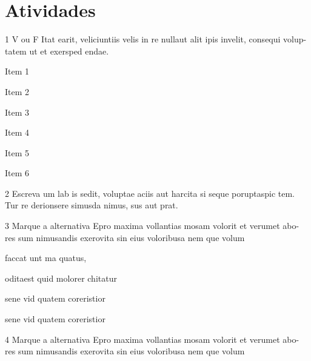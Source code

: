 \pagebreak
\section{Atividades}

\num{1} V ou F Itat earit, veliciuntiis velis in re nullaut alit ipis invelit, consequi volup-
tatem ut et exersped endae.

\begin{boxlist}
    \item Item 1 

    \item Item 2

    \item Item 3

    \item Item 4

    \item Item 5

    \item Item 6
\end{boxlist}


\num{2} Escreva um lab is sedit, voluptae aciis aut harcita si seque poruptaspic tem.
Tur re derionsere simusda nimus, sus aut prat.

\linhas

\num{3} Marque a alternativa Epro maxima vollantias mosam volorit et verumet abo-
res sum nimusandis exerovita sin eius voloribusa nem que volum

\begin{escolha}
\item faccat unt ma quatus,

\item oditaest quid molorer chitatur

\item sene vid quatem coreristior

\item sene vid quatem coreristior
\end{escolha}

\num{4} Marque a alternativa Epro maxima vollantias mosam volorit et verumet abo-
res sum nimusandis exerovita sin eius voloribusa nem que volum


